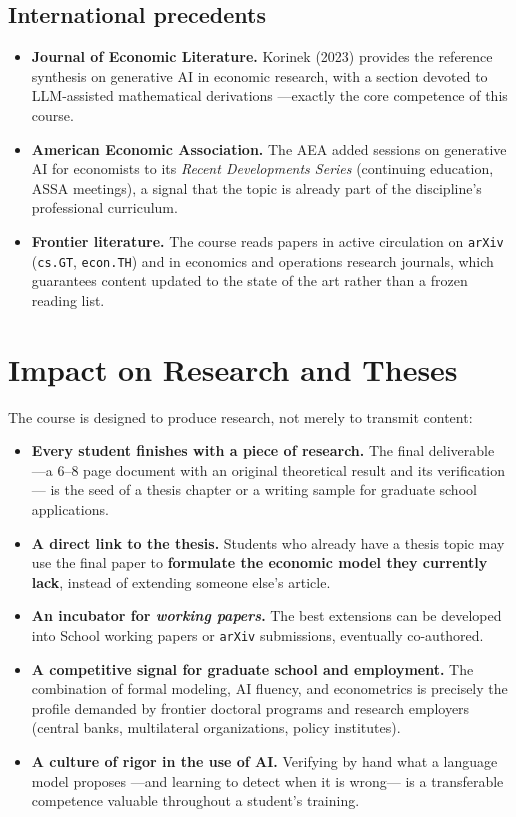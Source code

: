 \documentclass[11pt]{article}
\begin{document}
\subsection*{International precedents}
\begin{itemize}
\item \textbf{Journal of Economic Literature.} Korinek (2023) provides the reference synthesis on generative AI in economic research, with a section devoted to LLM-assisted mathematical derivations ---exactly the core competence of this course.
\item \textbf{American Economic Association.} The AEA added sessions on generative AI for economists to its \emph{Recent Developments Series} (continuing education, ASSA meetings), a signal that the topic is already part of the discipline's professional curriculum.
\item \textbf{Frontier literature.} The course reads papers in active circulation on \texttt{arXiv} (\texttt{cs.GT}, \texttt{econ.TH}) and in economics and operations research journals, which guarantees content updated to the state of the art rather than a frozen reading list.
\end{itemize}

\section{Impact on Research and Theses}

The course is designed to produce research, not merely to transmit content:

\begin{itemize}
\item \textbf{Every student finishes with a piece of research.} The final deliverable ---a 6--8 page document with an original theoretical result and its verification--- is the seed of a thesis chapter or a writing sample for graduate school applications.
\item \textbf{A direct link to the thesis.} Students who already have a thesis topic may use the final paper to \textbf{formulate the economic model they currently lack}, instead of extending someone else's article.
\item \textbf{An incubator for \emph{working papers}.} The best extensions can be developed into School working papers or \texttt{arXiv} submissions, eventually co-authored.
\item \textbf{A competitive signal for graduate school and employment.} The combination of formal modeling, AI fluency, and econometrics is precisely the profile demanded by frontier doctoral programs and research employers (central banks, multilateral organizations, policy institutes).
\item \textbf{A culture of rigor in the use of AI.} Verifying by hand what a language model proposes ---and learning to detect when it is wrong--- is a transferable competence valuable throughout a student's training.
\end{itemize}
\end{document}
